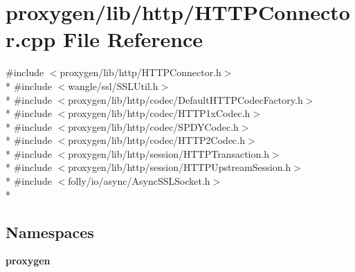 \section{proxygen/lib/http/\+H\+T\+T\+P\+Connector.cpp File Reference}
\label{HTTPConnector_8cpp}
{\ttfamily \#include $<$proxygen/lib/http/\+H\+T\+T\+P\+Connector.\+h$>$}\\*
{\ttfamily \#include $<$wangle/ssl/\+S\+S\+L\+Util.\+h$>$}\\*
{\ttfamily \#include $<$proxygen/lib/http/codec/\+Default\+H\+T\+T\+P\+Codec\+Factory.\+h$>$}\\*
{\ttfamily \#include $<$proxygen/lib/http/codec/\+H\+T\+T\+P1x\+Codec.\+h$>$}\\*
{\ttfamily \#include $<$proxygen/lib/http/codec/\+S\+P\+D\+Y\+Codec.\+h$>$}\\*
{\ttfamily \#include $<$proxygen/lib/http/codec/\+H\+T\+T\+P2\+Codec.\+h$>$}\\*
{\ttfamily \#include $<$proxygen/lib/http/session/\+H\+T\+T\+P\+Transaction.\+h$>$}\\*
{\ttfamily \#include $<$proxygen/lib/http/session/\+H\+T\+T\+P\+Upstream\+Session.\+h$>$}\\*
{\ttfamily \#include $<$folly/io/async/\+Async\+S\+S\+L\+Socket.\+h$>$}\\*
\subsection*{Namespaces}
\begin{DoxyCompactItemize}
\item 
 {\bf proxygen}
\end{DoxyCompactItemize}

